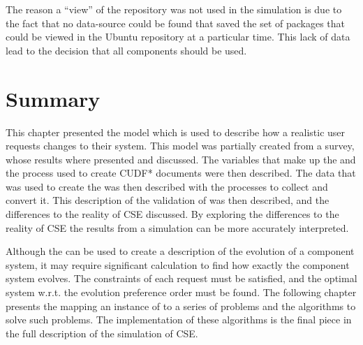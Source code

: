 The reason a ``view'' of the repository was not used in the simulation is due to the fact that no data-source could be found 
that saved the set of packages that could be viewed in the Ubuntu repository at a particular time.
This lack of data lead to the decision that all components should be used.

\section{Summary}
This chapter presented the \usermodel model which is used to describe how a realistic user requests changes to their system.
This model was partially created from a survey, whose results where presented and discussed.
The variables that make up the \usermodel and the process used to create CUDF* documents were then described.
The data that was used to create the \usermodel was then described with the processes to collect and convert it.
This description of the validation of \usermodel was then described, and the differences to the reality of CSE discussed.
By exploring the differences to the reality of CSE the results from a simulation can be more accurately interpreted.

Although the \usermodel can be used to create a description of the evolution of a component system, it may require significant calculation to find how exactly the component system evolves.
The constraints of each request must be satisfied, and the optimal system w.r.t. the evolution preference order must be found.
The following chapter presents the mapping an instance of \modelname to a series of problems and the algorithms to solve such problems.
The implementation of these algorithms is the final piece in the full description of the simulation of CSE.

